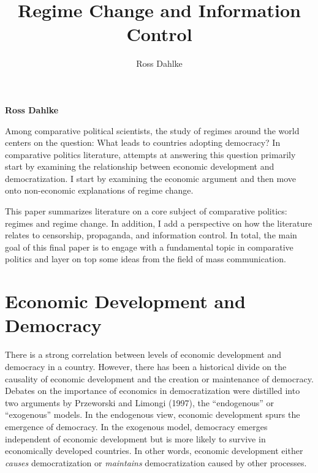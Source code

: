 \documentclass[12pt,]{article}
\title{Regime Change and Information Control  }
\author{\Large Ross Dahlke\vspace{0.05in} \newline\normalsize\emph{}  }
\date{}
\newcommand*{\authorfont}{\fontfamily{phv}\selectfont}
\begin{document}
	
%

{%
\setlength{\parindent}{0pt}
\thispagestyle{plain}
{\fontsize{18}{20}\selectfont\raggedright 
\maketitle  %

}

{
   \vskip 13.5pt\relax \normalsize\fontsize{11}{12} 
\textbf{\authorfont Ross Dahlke} \hskip 15pt \emph{\small }   

}

}






\vskip -8.5pt



\noindent \doublespacing 

Among comparative political scientists, the study of regimes around the
world centers on the question: What leads to countries adopting
democracy? In comparative politics literature, attempts at answering
this question primarily start by examining the relationship between
economic development and democratization. I start by examining the
economic argument and then move onto non-economic explanations of regime
change.

This paper summarizes literature on a core subject of comparative
politics: regimes and regime change. In addition, I add a perspective on
how the literature relates to censorship, propaganda, and information
control. In total, the main goal of this final paper is to engage with a
fundamental topic in comparative politics and layer on top some ideas
from the field of mass communication.

\hypertarget{economic-development-and-democracy}{%
\section{Economic Development and
Democracy}\label{economic-development-and-democracy}}

There is a strong correlation between levels of economic development and
democracy in a country. However, there has been a historical divide on
the causality of economic development and the creation or maintenance of
democracy. Debates on the importance of economics in democratization
were distilled into two arguments by Przeworski and Limongi (1997), the
``endogenous'' or ``exogenous'' models. In the endogenous view, economic
development spurs the emergence of democracy. In the exogenous model,
democracy emerges independent of economic development but is more likely
to survive in economically developed countries. In other words, economic
development either \emph{causes} democratization or \emph{maintains}
democratization caused by other processes.
\end{document}
